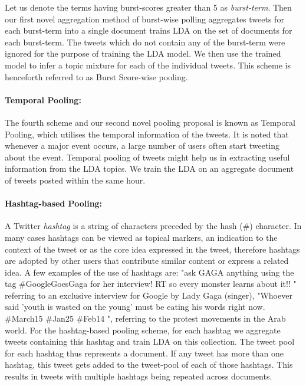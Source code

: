 \documentclass[10pt,a5paper,twoside]{article}
\begin{document}
Let us denote the terms having burst-scores greater than 5 as
\textit{burst-term}.  Then our first novel aggregation method of
burst-wise polling aggregates tweets for each burst-term into a single
document trains LDA on the set of documents for each burst-term. The
tweets which do not contain any of the burst-term were ignored for the
purpose of training the LDA model. We then use the trained model to
infer a topic mixture for each of the individual tweets. This scheme
is henceforth referred to as Burst Score-wise pooling.

\paragraph{Temporal Pooling: }

The fourth scheme and our second novel pooling proposal is known as
Temporal Pooling, which utilises the temporal information of the tweets. It
is noted that whenever a major event occurs, a large number of users
often start tweeting about the event. Temporal pooling of tweets might help
us in extracting useful information from the LDA topics. We train the
LDA on an aggregate document of tweets posted within the same hour.

\paragraph{Hashtag-based Pooling:}

A Twitter \textit{hashtag} is a string of characters preceded by the
hash (\#) character. In many cases hashtags can be viewed as topical
markers, an indication to the context of the tweet or as the core idea
expressed in the tweet, therefore hashtags are adopted by other users
that contribute similar content or express a related idea. A few
examples of the use of hashtags are: "ask GAGA anything using the tag
\#GoogleGoesGaga for her interview! RT so every monster learns about
it!! " referring to an exclusive interview for Google by Lady Gaga
(singer), "Whoever said 'youth is wasted on the young' must be eating
his words right now. \#March15 \#Jan25 \#Feb14 ", referring to the
protest movements in the Arab world.  For the hashtag-based pooling
scheme, for each hashtag we aggregate tweets containing this hashtag
and train LDA on this collection.  The tweet pool for each hashtag
thus represents a document. If any tweet has more than one hashtag,
this tweet gets added to the tweet-pool of each of those
hashtags. This results in tweets with multiple hashtags being repeated
across documents.
\end{document}
